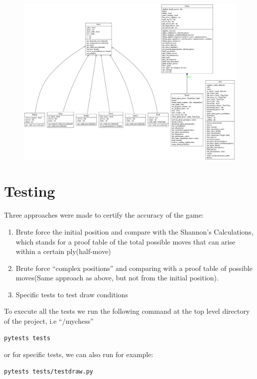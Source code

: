 \documentclass[10pt]{article}
\begin{document}
\begin{figure}[H]
    \includegraphics[scale=0.2]{fig/classes_Chess.png}
\end{figure}


\section{Testing}

Three approaches were made to certify the accuracy of the game:

\begin{enumerate}[label=\arabic*)]
\item Brute force the initial position and compare with the Shannon's
    Calculations, which stands for a proof table of the total possible moves
    that can arise within a certain ply(half-move)
\item Brute force ``complex positions'' and comparing with a proof table of possible
    moves(Same approach as above, but not from the initial position).
\item Specific tests to test draw conditions
\end{enumerate}

To execute all the tests we run the following command at the top level directory
of the project, i.e ``/mychess''
\begin{lstlisting}
pytests tests
\end{lstlisting}

or for specific tests, we can also run for example:

\begin{lstlisting}
pytests tests/testdraw.py
\end{lstlisting}
\end{document}
